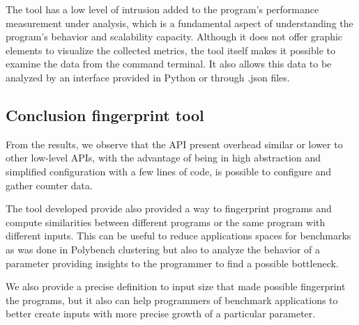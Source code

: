 The tool has a low level of intrusion added to the program's performance measurement under analysis, which is a fundamental aspect of understanding the program's behavior and scalability capacity. 
Although it does not offer graphic elements to visualize the collected metrics, the tool itself makes it possible to examine the data from the command terminal. It also allows this data to be analyzed by an interface provided in Python or through .json files. 


\subsection{Conclusion fingerprint tool}

From the results, we observe that the API present overhead similar or lower to other low-level APIs, with the advantage of being in high abstraction and simplified configuration with a few lines of code, is possible to configure and gather counter data.

The tool developed provide also provided a way to fingerprint programs and compute similarities between different programs or the same program with different inputs. This can be useful to reduce applications spaces for benchmarks as was done in Polybench clustering but also to analyze the behavior of a parameter providing insights to the programmer to find a possible bottleneck.

We also provide a precise definition to input size that made possible fingerprint the programs, but it also can help programmers of benchmark applications to better create inputs with more precise growth of a particular parameter.

